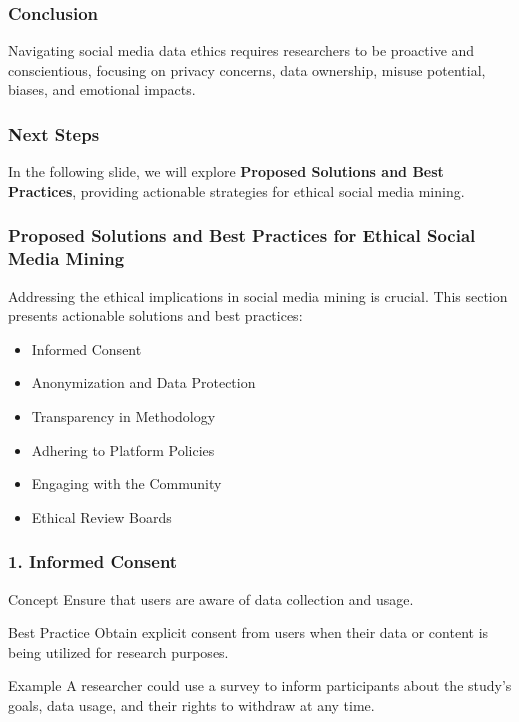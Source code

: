 \documentclass{beamer}
\begin{document}
\begin{frame}[fragile]
    \frametitle{Conclusion}
    Navigating social media data ethics requires researchers to be proactive and conscientious, focusing on privacy concerns, data ownership, misuse potential, biases, and emotional impacts.
\end{frame}

\begin{frame}[fragile]
    \frametitle{Next Steps}
    In the following slide, we will explore \textbf{Proposed Solutions and Best Practices}, providing actionable strategies for ethical social media mining.
\end{frame}

\begin{frame}[fragile]
    \frametitle{Proposed Solutions and Best Practices for Ethical Social Media Mining}
    
    Addressing the ethical implications in social media mining is crucial. This section presents actionable solutions and best practices:
    
    \begin{itemize}
        \item Informed Consent
        \item Anonymization and Data Protection
        \item Transparency in Methodology
        \item Adhering to Platform Policies
        \item Engaging with the Community
        \item Ethical Review Boards
    \end{itemize}
\end{frame}

\begin{frame}[fragile]
    \frametitle{1. Informed Consent}

    \begin{block}{Concept}
        Ensure that users are aware of data collection and usage.
    \end{block}
    
    \begin{block}{Best Practice}
        Obtain explicit consent from users when their data or content is being utilized for research purposes.
    \end{block}
    
    \begin{block}{Example}
        A researcher could use a survey to inform participants about the study's goals, data usage, and their rights to withdraw at any time.
    \end{block}
\end{frame}
\end{document}
